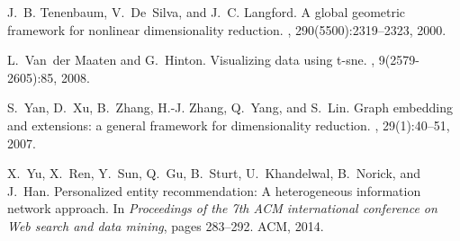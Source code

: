 \documentclass{sig-alternate-2013}
\begin{document}
\begin{thebibliography}{10}
	J.~B. Tenenbaum, V.~De~Silva, and J.~C. Langford.
	\newblock A global geometric framework for nonlinear dimensionality reduction.
	, 290(5500):2319--2323, 2000.
	
	L.~Van~der Maaten and G.~Hinton.
	\newblock Visualizing data using t-sne.
	, 9(2579-2605):85, 2008.
	
	S.~Yan, D.~Xu, B.~Zhang, H.-J. Zhang, Q.~Yang, and S.~Lin.
	\newblock Graph embedding and extensions: a general framework for
	dimensionality reduction.
	, 29(1):40--51, 2007.
	
	X.~Yu, X.~Ren, Y.~Sun, Q.~Gu, B.~Sturt, U.~Khandelwal, B.~Norick, and J.~Han.
	\newblock Personalized entity recommendation: A heterogeneous information
	network approach.
	\newblock In {\em Proceedings of the 7th ACM international conference on Web
		search and data mining}, pages 283--292. ACM, 2014.
	
\end{thebibliography}
\end{document}
